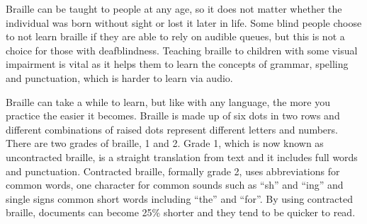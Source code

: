 Braille can be taught to people at any age, so it does not matter whether the individual was born without sight or lost it later in life.
Some blind people choose to not learn braille if they are able to rely on audible queues, but this is not a choice for those with deafblindness.
Teaching braille to children with some visual impairment is vital as it helps them to learn the concepts of grammar, spelling and punctuation, which is harder to learn via audio.  

Braille can take a while to learn, but like with any language, the more you practice the easier it becomes.
Braille is made up of six dots in two rows and different combinations of raised dots represent different letters and numbers.
There are two grades of braille, 1 and 2. Grade 1, which is now known as uncontracted braille, is a straight translation from text and it includes full words and punctuation.
Contracted braille, formally grade 2, uses abbreviations for common words, one character for common sounds such as ``sh'' and ``ing'' and single signs common short words including ``the'' and ``for''.
By using contracted braille, documents can become 25\% shorter and they tend to be quicker to read.  